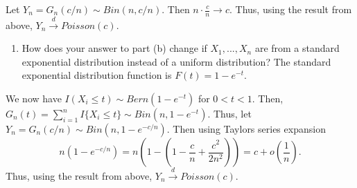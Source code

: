 \documentclass[12pt,]{article}
\providecommand{\tightlist}{%
  \setlength{\itemsep}{0pt}\setlength{\parskip}{0pt}}
\begin{document}
Let \(Y_n = G_n(c/n)\sim Bin(n, c/n).\) Then
\(n\cdot \frac{c}{n} \rightarrow c.\) Thus, using the result from above,
\(Y_n\overset{d}\rightarrow Poisson(c).\)

\begin{enumerate}
\def\labelenumi{(\alph{enumi})}
\setcounter{enumi}{2}
\tightlist
\item
  How does your answer to part (b) change if \(X_1,...,X_n\) are from a
  standard exponential distribution instead of a uniform distribution?
  The standard exponential distribution function is \(F(t) = 1-e^{-t}.\)
\end{enumerate}

We now have \(I(X_i \le t)\sim Bern(1-e^{-t})\) for \(0<t<1.\) Then,
\(G_n(t) = \sum_{i=1}^nI\{X_i\le t\}\sim Bin(n, 1-e^{-t}).\) Thus, let
\(Y_n = G_n(c/n)\sim Bin(n, 1-e^{-c/n}).\) Then using Taylors series
expansion
\[n(1-e^{-c/n})=n\left(1 - \left(1 - \frac{c}{n} + \frac{c^2}{2n^2}\right)\right) = c + o\left(\frac{1}{n}\right).\]
Thus, using the result from above,
\(Y_n\overset{d}\rightarrow Poisson(c).\)
\end{document}
